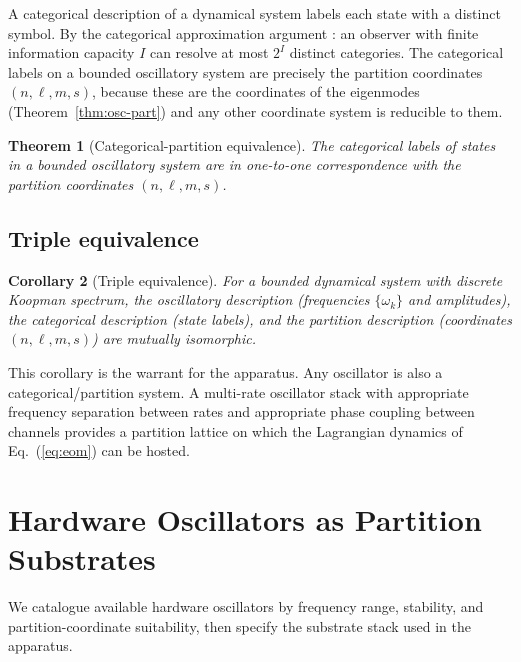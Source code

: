 \documentclass[twocolumn,11pt,a4paper]{article}
\newtheorem{theorem}{Theorem}[section]
\newtheorem{corollary}[theorem]{Corollary}
\theoremstyle{definition}
\theoremstyle{remark}
\begin{document}
A categorical description of a dynamical system labels each state with a distinct symbol. By the categorical approximation argument \citep{shannon1948}: an observer with finite information capacity $I$ can resolve at most $2^I$ distinct categories. The categorical labels on a bounded oscillatory system are precisely the partition coordinates $(n, \ell, m, s)$, because these are the coordinates of the eigenmodes (Theorem~\ref{thm:osc-part}) and any other coordinate system is reducible to them.

\begin{theorem}[Categorical-partition equivalence]
\label{thm:cat-part}
The categorical labels of states in a bounded oscillatory system are in one-to-one correspondence with the partition coordinates $(n, \ell, m, s)$.
\end{theorem}

\subsection{Triple equivalence}

\begin{corollary}[Triple equivalence]
\label{cor:triple}
For a bounded dynamical system with discrete Koopman spectrum, the oscillatory description (frequencies $\{\omega_k\}$ and amplitudes), the categorical description (state labels), and the partition description (coordinates $(n, \ell, m, s)$) are mutually isomorphic.
\end{corollary}

This corollary is the warrant for the apparatus. Any oscillator is also a categorical/partition system. A multi-rate oscillator stack with appropriate frequency separation between rates and appropriate phase coupling between channels provides a partition lattice on which the Lagrangian dynamics of Eq.~(\ref{eq:eom}) can be hosted.

\section{Hardware Oscillators as Partition Substrates}
\label{sec:substrate}

We catalogue available hardware oscillators by frequency range, stability, and partition-coordinate suitability, then specify the substrate stack used in the apparatus.
\end{document}
